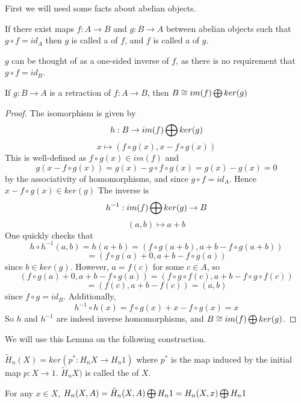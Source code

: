 First we will need some facts about abelian objects.

\begin{definition}
If there exist maps $f:A\rightarrow B$ and $g:B\rightarrow A$ between abelian objects such that $g\circ f = id_A$ then $g$ is called a  of $f$, and $f$ is called a  of $g$.
\end{definition}

$g$ can be thought of as a one-sided inverse of $f$, as there is no requirement that $g\circ f=id_B$.

\begin{lemma}
If $g:B\rightarrow A$ is a retraction of $f:A\rightarrow B$, then $B\cong im(f)\bigoplus ker(g)$ 
\end{lemma}

\begin{proof}
\label{direct-sum-iso}
The isomorphism is given by $$h:B\rightarrow im(f)\bigoplus ker(g)$$
$$x \mapsto (f\circ g(x),x-f\circ g(x))$$
This is well-defined as $f\circ g(x)\in im(f)$ and 
$$g(x-f\circ g(x))=g(x)-g\circ f \circ g(x)=g(x)-g(x)=0$$
by the associativity of homomorphisms, and since $g\circ f= id_A$. Hence $x-f\circ g(x)\in ker(g)$
The inverse is $$h^{-1}:im(f)\bigoplus ker(g)\rightarrow B$$
$$(a,b)\mapsto a+b$$
One quickly checks that
$$h\circ h^{-1}(a,b)=h(a+b)=(f\circ g(a+b),a+b - f\circ g(a+b))$$
$$=(f\circ g(a)+0,a+b-f\circ g(a))$$
since $b\in ker(g)$. However, $a=f(c)$ for some $c\in A$, so
$$(f\circ g(a)+0,a+b-f\circ g(a))=(f\circ g \circ f(c),a+b-f\circ g \circ f(c))$$
$$=(f(c),a+b-f(c))=(a,b)$$
since $f\circ g=id_B$. Additionally,
$$h^{-1}\circ h(x)=f\circ g(x)+x-f\circ g(x)=x$$
So $h$ and $h^{-1}$ are indeed inverse homomorphisms, and $B\cong im(f)\bigoplus ker(g)$.
\end{proof}

We will use this Lemma on the following construction.

\begin{definition}
$\tilde{H}_n(X)=ker(p^*:H_nX\rightarrow H_n1)$ where $p^*$ is the map induced by the initial map $p:X\rightarrow 1$. $\tilde{H}_nX)$ is called the  of $X$.
\end{definition}

\begin{prop}
\label{reduced-homology}
For any $x\in X$,
$H_n(X,A)=\tilde{H}_n(X,A)\bigoplus H_n1=H_n(X,x)\bigoplus H_n1$
\end{prop}

